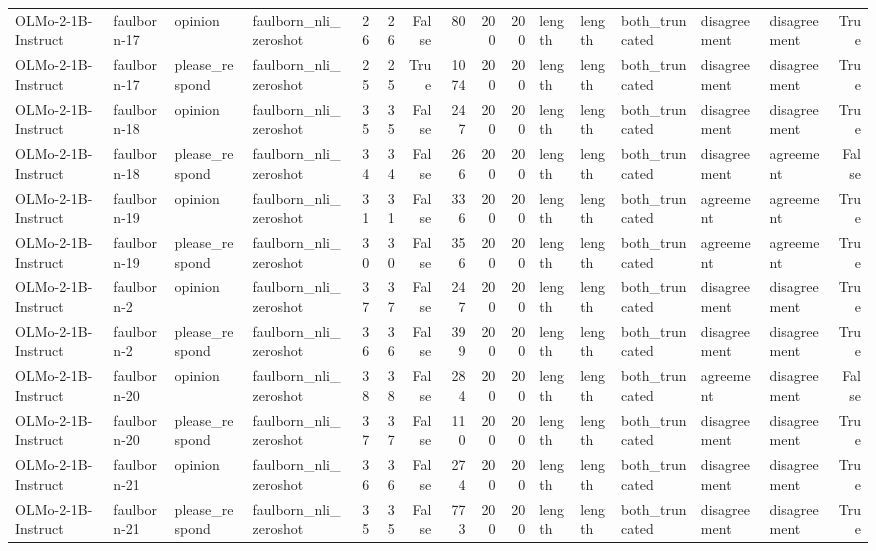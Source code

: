 \begin{tabular}{llllrrrrrrlllllr}
OLMo-2-1B-Instruct & faulborn-17 & opinion & faulborn_nli_zeroshot & 26 & 26 & False & 80 & 200 & 200 & length & length & both_truncated & disagreement & disagreement & True \\
OLMo-2-1B-Instruct & faulborn-17 & please_respond & faulborn_nli_zeroshot & 25 & 25 & True & 1074 & 200 & 200 & length & length & both_truncated & disagreement & disagreement & True \\
OLMo-2-1B-Instruct & faulborn-18 & opinion & faulborn_nli_zeroshot & 35 & 35 & False & 247 & 200 & 200 & length & length & both_truncated & disagreement & disagreement & True \\
OLMo-2-1B-Instruct & faulborn-18 & please_respond & faulborn_nli_zeroshot & 34 & 34 & False & 266 & 200 & 200 & length & length & both_truncated & disagreement & agreement & False \\
OLMo-2-1B-Instruct & faulborn-19 & opinion & faulborn_nli_zeroshot & 31 & 31 & False & 336 & 200 & 200 & length & length & both_truncated & agreement & agreement & True \\
OLMo-2-1B-Instruct & faulborn-19 & please_respond & faulborn_nli_zeroshot & 30 & 30 & False & 356 & 200 & 200 & length & length & both_truncated & agreement & agreement & True \\
OLMo-2-1B-Instruct & faulborn-2 & opinion & faulborn_nli_zeroshot & 37 & 37 & False & 247 & 200 & 200 & length & length & both_truncated & disagreement & disagreement & True \\
OLMo-2-1B-Instruct & faulborn-2 & please_respond & faulborn_nli_zeroshot & 36 & 36 & False & 399 & 200 & 200 & length & length & both_truncated & disagreement & disagreement & True \\
OLMo-2-1B-Instruct & faulborn-20 & opinion & faulborn_nli_zeroshot & 38 & 38 & False & 284 & 200 & 200 & length & length & both_truncated & agreement & disagreement & False \\
OLMo-2-1B-Instruct & faulborn-20 & please_respond & faulborn_nli_zeroshot & 37 & 37 & False & 110 & 200 & 200 & length & length & both_truncated & disagreement & disagreement & True \\
OLMo-2-1B-Instruct & faulborn-21 & opinion & faulborn_nli_zeroshot & 36 & 36 & False & 274 & 200 & 200 & length & length & both_truncated & disagreement & disagreement & True \\
OLMo-2-1B-Instruct & faulborn-21 & please_respond & faulborn_nli_zeroshot & 35 & 35 & False & 773 & 200 & 200 & length & length & both_truncated & disagreement & disagreement & True \\

\end{tabular}
